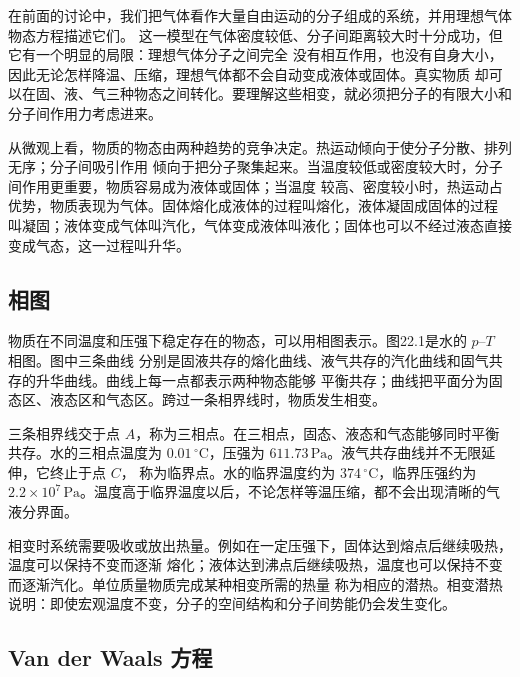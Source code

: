 在前面的讨论中，我们把气体看作大量自由运动的分子组成的系统，并用理想气体物态方程描述它们。
这一模型在气体密度较低、分子间距离较大时十分成功，但它有一个明显的局限：理想气体分子之间完全
没有相互作用，也没有自身大小，因此无论怎样降温、压缩，理想气体都不会自动变成液体或固体。真实物质
却可以在固、液、气三种物态之间转化。要理解这些相变，就必须把分子的有限大小和分子间作用力考虑进来。

从微观上看，物质的物态由两种趋势的竞争决定。热运动倾向于使分子分散、排列无序；分子间吸引作用
倾向于把分子聚集起来。当温度较低或密度较大时，分子间作用更重要，物质容易成为液体或固体；当温度
较高、密度较小时，热运动占优势，物质表现为气体。固体熔化成液体的过程叫熔化，液体凝固成固体的过程
叫凝固；液体变成气体叫汽化，气体变成液体叫液化；固体也可以不经过液态直接变成气态，这一过程叫升华。

\subsection*{相图}

物质在不同温度和压强下稳定存在的物态，可以用相图表示。图22.1是水的 $p$--$T$ 相图。图中三条曲线
分别是固液共存的熔化曲线、液气共存的汽化曲线和固气共存的升华曲线。曲线上每一点都表示两种物态能够
平衡共存；曲线把平面分为固态区、液态区和气态区。跨过一条相界线时，物质发生相变。

\phaseDiagramWater
{}

三条相界线交于点 $A$，称为三相点。在三相点，固态、液态和气态能够同时平衡共存。水的三相点温度为
$0.01\,{}^{\circ}\mathrm C$，压强为 $611.73\,\mathrm{Pa}$。液气共存曲线并不无限延伸，它终止于点 $C$，
称为临界点。水的临界温度约为 $374\,{}^{\circ}\mathrm C$，临界压强约为
$2.2\times10^7\,\mathrm{Pa}$。温度高于临界温度以后，不论怎样等温压缩，都不会出现清晰的气液分界面。

相变时系统需要吸收或放出热量。例如在一定压强下，固体达到熔点后继续吸热，温度可以保持不变而逐渐
熔化；液体达到沸点后继续吸热，温度也可以保持不变而逐渐汽化。单位质量物质完成某种相变所需的热量
称为相应的潜热。相变潜热说明：即使宏观温度不变，分子的空间结构和分子间势能仍会发生变化。



\subsection*{Van der Waals 方程}

